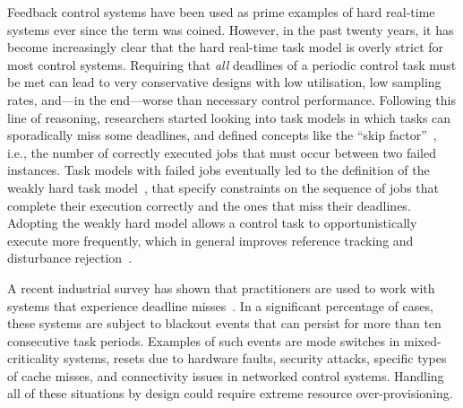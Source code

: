 Feedback control systems have been used as prime examples of hard
real-time systems ever since the term was coined. However, in the 
past twenty years, it has become increasingly clear that the hard
real-time task model is overly strict for most control
systems. Requiring that \emph{all} deadlines of a periodic control
task must be met can lead to very conservative designs with low
utilisation, low sampling rates, and---in the end---worse than
necessary control performance. Following this line of reasoning, researchers started looking into task models in which tasks can sporadically miss some deadlines, and defined concepts like the ``skip factor''~\cite{Koren:1995}, i.e., the number of correctly executed jobs that must occur between two failed instances. Task models with failed jobs eventually led to the definition of the weakly hard task
model~\cite{Bernat:2001}, that specify constraints on the sequence of jobs that complete their execution correctly and the ones that miss their deadlines.
Adopting the weakly hard model allows a control task to opportunistically
execute more frequently, which in general improves reference tracking
and disturbance rejection~\cite{Chakraborty:2014a, Linsenmayer:2017, Pazzaglia:2018}.

A recent industrial survey has shown that practitioners are
used to work with systems that experience deadline
misses~\cite[Questions 14 and 15]{Akesson:2020}. In a significant
percentage of cases, these systems are subject to blackout events that
can persist for more than ten consecutive task periods. Examples of such
events are mode switches in mixed-criticality systems, resets due to
hardware faults, security attacks, specific types of cache misses, and
connectivity issues in networked control systems. Handling all of
these situations by design could require extreme resource
over-provisioning.

